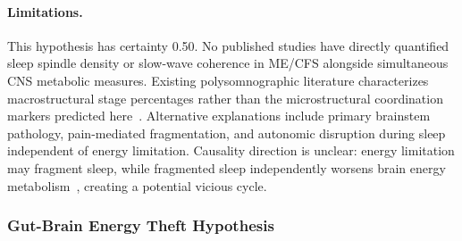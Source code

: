 \begin{hypothesis}
\paragraph{Limitations.}
This hypothesis has certainty 0.50. No published studies have directly quantified sleep spindle density or slow-wave coherence in ME/CFS alongside simultaneous CNS metabolic measures. Existing polysomnographic literature characterizes macrostructural stage percentages rather than the microstructural coordination markers predicted here~\cite{Jackson2023sleep}. Alternative explanations include primary brainstem pathology, pain-mediated fragmentation, and autonomic disruption during sleep independent of energy limitation. Causality direction is unclear: energy limitation may fragment sleep, while fragmented sleep independently worsens brain energy metabolism~\cite{Baud2016fragmentation}, creating a potential vicious cycle.
\end{hypothesis}

\subsubsection{Gut-Brain Energy Theft Hypothesis}

